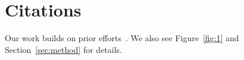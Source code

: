 \documentclass{article}
\begin{document}



\section{Citations}
Our work builds on prior efforts~\cite{author2024,doe2025,127}.
We also see Figure~\ref{fig:1} and Section~\ref{sec:method} for details.
\end{document}

